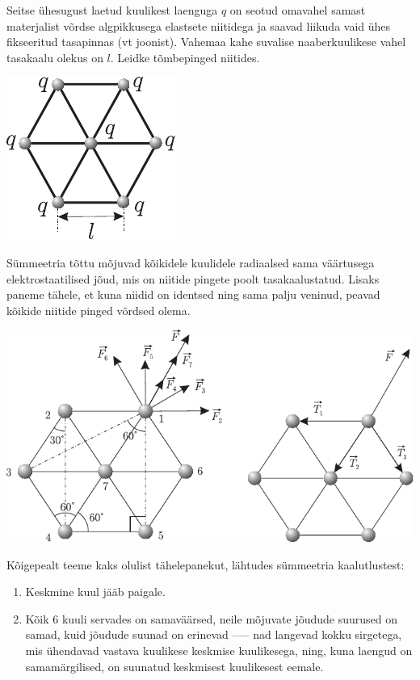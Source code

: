 
Seitse ühesugust laetud kuulikest laenguga $q$ on seotud omavahel samast materjalist võrdse algpikkusega elastsete niitidega ja saavad liikuda vaid ühes fikseeritud tasapinnas (vt joonist). Vahemaa kahe suvalise naaberkuulikese vahel tasakaalu olekus on $l$. Leidke tõmbepinged niitides.

\begin{center}
	\includegraphics[width=0.35\linewidth]{2005-lahg-04-yl}
\end{center}

\hint
Sümmeetria tõttu mõjuvad kõikidele kuulidele radiaalsed sama väärtusega elektrostaatilised jõud, mis on niitide pingete poolt tasakaalustatud. Lisaks paneme tähele, et kuna niidid on identsed ning sama palju veninud, peavad kõikide niitide pinged võrdsed olema.

\solu
\begin{center}
	\includegraphics[width=\linewidth]{2005-lahg-04-lah}
\end{center}

Kõigepealt teeme kaks olulist tähelepanekut, lähtudes sümmeetria kaalutlustest:
\begin{enumerate}[wide=0pt, label={\arabic*)}]
	\item Keskmine kuul jääb paigale.
	\item Kõik 6 kuuli servades on samaväärsed, neile mõjuvate jõudude suurused on samad, kuid jõudude suunad on erinevad –--- nad langevad kokku sirgetega, mis ühendavad vastava kuulikese keskmise kuulikesega, ning, kuna laengud on samamärgilised, on suunatud keskmisest kuulikesest eemale.
\end{enumerate}

